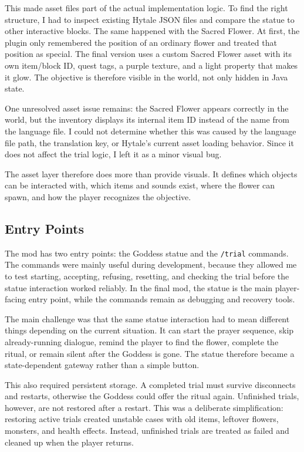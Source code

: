 This made asset files part of the actual implementation logic.
To find the right structure,
I had to inspect existing Hytale JSON files
and compare the statue to other interactive blocks.
The same happened with the Sacred Flower.
At first,
the plugin only remembered the position of an ordinary flower
and treated that position as special.
The final version uses a custom Sacred Flower asset with its own item/block ID,
quest tags,
a purple texture,
and a light property that makes it glow.
The objective is therefore visible in the world,
not only hidden in Java state.

One unresolved asset issue remains:
the Sacred Flower appears correctly in the world,
but the inventory displays its internal item ID
instead of the name from the language file.
I could not determine whether this was caused by the language file path,
the translation key,
or Hytale's current asset loading behavior.
Since it does not affect the trial logic,
I left it as a minor visual bug.

The asset layer therefore does more than provide visuals.
It defines which objects can be interacted with,
which items and sounds exist,
where the flower can spawn,
and how the player recognizes the objective.


\subsection{Entry Points}

The mod has two entry points:
the Goddess statue and the \texttt{/trial} commands.
The commands were mainly useful during development,
because they allowed me to test starting,
accepting,
refusing,
resetting,
and checking the trial before the statue interaction worked reliably.
In the final mod,
the statue is the main player-facing entry point,
while the commands remain as debugging and recovery tools.

The main challenge was that the same statue interaction had to mean different things
depending on the current situation.
It can start the prayer sequence,
skip already-running dialogue,
remind the player to find the flower,
complete the ritual,
or remain silent after the Goddess is gone.
The statue therefore became a state-dependent gateway rather than a simple button.

This also required persistent storage.
A completed trial must survive disconnects and restarts,
otherwise the Goddess could offer the ritual again.
Unfinished trials,
however,
are not restored after a restart.
This was a deliberate simplification:
restoring active trials created unstable cases with old items,
leftover flowers,
monsters,
and health effects.
Instead,
unfinished trials are treated as failed and cleaned up when the player returns.



